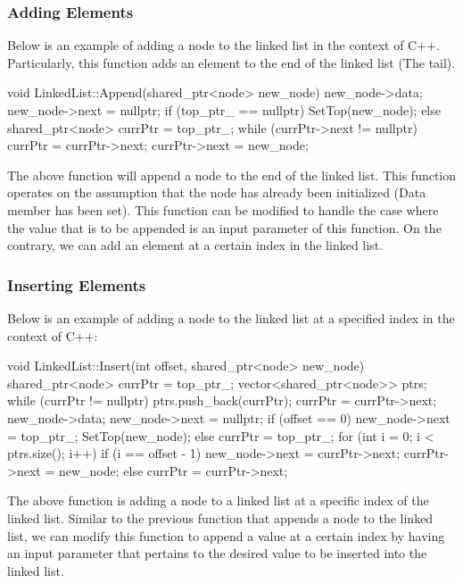 \begin{highlight}

\subsubsection*{Adding Elements}

Below is an example of adding a node to the linked list in the context of C++. Particularly, this function adds an element to the end of the linked list (The tail).

\begin{code}
void LinkedList::Append(shared_ptr<node> new_node){
    new_node->data;
    new_node->next = nullptr;
    if (top_ptr_ == nullptr) {
        SetTop(new_node);
    }
    else {
        shared_ptr<node> currPtr = top_ptr_;
        while (currPtr->next != nullptr) {
            currPtr = currPtr->next;
        }
        currPtr->next = new_node;
    }
}
\end{code}

The above function will append a node to the end of the linked list. This function operates on the assumption that the node has already been initialized (Data member has been set). This function can
be modified to handle the case where the value that is to be appended is an input parameter of this function. On the contrary, we can add an element at a certain index in the linked list.

\subsubsection*{Inserting Elements}

Below is an example of adding a node to the linked list at a specified index in the context of C++:

\begin{code}
void LinkedList::Insert(int offset, shared_ptr<node> new_node){
    shared_ptr<node> currPtr = top_ptr_;
    vector<shared_ptr<node>> ptrs;
    while (currPtr != nullptr) {
        ptrs.push_back(currPtr);
        currPtr = currPtr->next;
    }
    new_node->data;
    new_node->next = nullptr;
    if (offset == 0) {
        new_node->next = top_ptr_;
        SetTop(new_node);
    }
    else {
    currPtr = top_ptr_;
        for (int i = 0; i < ptrs.size(); i++) {
            if (i == offset - 1) {
            new_node->next = currPtr->next;
            currPtr->next = new_node;
            }
            else {}
            currPtr = currPtr->next;
        }
    }
}
\end{code}

The above function is adding a node to a linked list at a specific index of the linked list. Similar to the previous function that appends a node to the linked list, we can modify this function to
append a value at a certain index by having an input parameter that pertains to the desired value to be inserted into the linked list.

\end{highlight}

